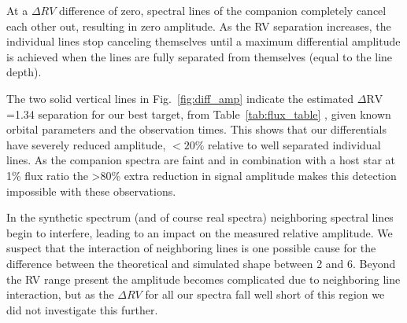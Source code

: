 At a \(\Delta RV\) difference of zero, spectral lines of the companion completely cancel each other out, resulting in zero amplitude. As the RV separation increases, the individual lines stop canceling themselves until a maximum differential amplitude is achieved when the lines are fully separated from themselves (equal to the line depth).

The two solid vertical lines in Fig.~\ref{fig:diff_amp} indicate the estimated \(\Delta \textrm{RV}\)=1.34\kmps{} separation for our best target,  from Table~\ref{tab:flux_table} , given known orbital parameters and the observation times. This shows that our differentials have severely reduced amplitude, \(<20\%\) relative to well separated individual lines. As the companion spectra are faint and in combination with a host star at 1\% flux ratio the >80\% extra reduction in signal amplitude makes this detection impossible with these observations.

In the synthetic spectrum (and of course real spectra) neighboring spectral lines begin to interfere, leading to an impact on the measured relative amplitude. We suspect that the interaction of neighboring lines is one possible cause for the difference between the theoretical and simulated shape between 2 and 6\kmps{}. Beyond the RV range present the amplitude becomes complicated due to neighboring line interaction, but as the \(\Delta RV\) for all our spectra fall well short of this region we did not investigate this further.

